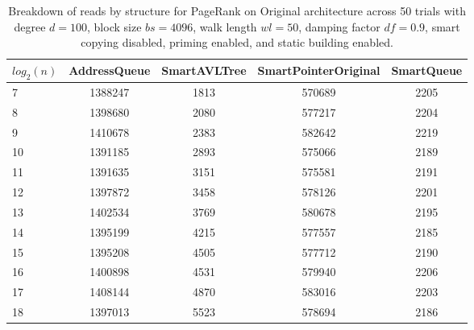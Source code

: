 \begin{table}[]
\centering
\begin{tabular}{|l|c|c|c|c|}
$log_2(n)$ & AddressQueue & SmartAVLTree & SmartPointerOriginal & SmartQueue \\ \hline
7 & 1388247 & 1813 & 570689 & 2205 \\ \hline
8 & 1398680 & 2080 & 577217 & 2204 \\ \hline
9 & 1410678 & 2383 & 582642 & 2219 \\ \hline
10 & 1391185 & 2893 & 575066 & 2189 \\ \hline
11 & 1391635 & 3151 & 575581 & 2191 \\ \hline
12 & 1397872 & 3458 & 578126 & 2201 \\ \hline
13 & 1402534 & 3769 & 580678 & 2195 \\ \hline
14 & 1395199 & 4215 & 577557 & 2185 \\ \hline
15 & 1395208 & 4505 & 577712 & 2190 \\ \hline
16 & 1400898 & 4531 & 579940 & 2206 \\ \hline
17 & 1408144 & 4870 & 583016 & 2203 \\ \hline
18 & 1397013 & 5523 & 578694 & 2186 \\ \hline
\end{tabular}
\caption{Breakdown of reads by structure for PageRank on Original architecture across 50 trials with degree $d=100$, block size $bs=4096$, walk length $wl=50$, damping factor $df=0.9$, smart copying disabled, priming enabled, and static building enabled.}
    \label{tab:reads_by_structure_pr_d100_bs4096_trials50_copiesfalse_primetrue_staticinsertiontrue_wl50_df0.9_ptoriginal_movefalse}
\end{table}

